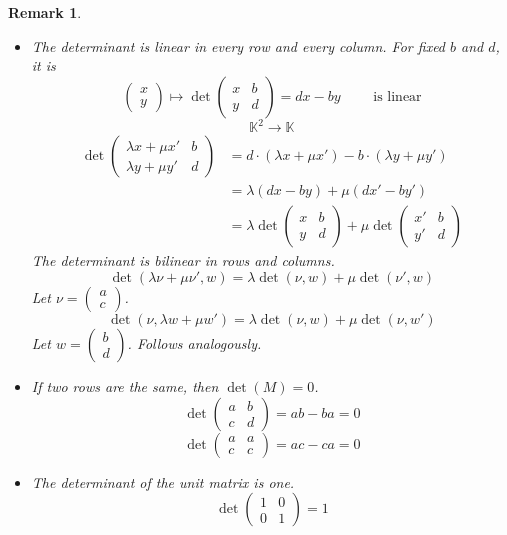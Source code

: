 \documentclass[a4paper]{article}
\numberwithin{lecref}{section}
\newtheorem*{Remark}{Remark}
\newcommand{\vectwo}[2]{\begin{pmatrix} #1 \\ #2 \end{pmatrix}}
\begin{document}
\begin{Remark} \hfill{}
  \begin{itemize}
    \item The determinant is linear in every row and every column.
      For fixed $b$ and $d$, it is
      \[ \vectwo xy \mapsto \det{\begin{pmatrix} x & b \\ y & d \end{pmatrix}} = dx - by \qquad \text{ is linear} \]
      \[ \mathbb K^2 \to \mathbb K \]
      \begin{align*}
        \det{\begin{pmatrix} \lambda x + \mu x' & b \\ \lambda y + \mu y' & d \end{pmatrix}}
          &= d \cdot (\lambda x + \mu x') - b \cdot (\lambda y + \mu y') \\
          &= \lambda (dx - by) + \mu (dx' - by') \\
          &= \lambda \det{\begin{pmatrix} x & b \\ y & d \end{pmatrix}} + \mu \det{\begin{pmatrix} x' & b \\  y' & d \end{pmatrix}}
      \end{align*}
      The determinant is bilinear in rows and columns.
      \[ \det(\lambda \nu + \mu \nu', w) = \lambda \det(\nu, w) + \mu \det(\nu', w) \]
      Let $\nu = \vectwo{a}{c}$.
      \[ \det(\nu, \lambda w + \mu w') = \lambda \det(\nu, w) + \mu \det(\nu, w') \]
      Let $w = \vectwo bd$.
      Follows analogously.
    \item If two rows are the same, then $\det(M) = 0$.
      \[ \det\begin{pmatrix} a & b \\ c & d \end{pmatrix} = ab - ba = 0 \]
      \[ \det\begin{pmatrix} a & a \\ c & c \end{pmatrix} = ac - ca = 0 \]
    \item The determinant of the unit matrix is one.
      \[ \det\begin{pmatrix} 1 & 0 \\ 0 & 1 \end{pmatrix} = 1 \]
  \end{itemize}
\end{Remark}
\end{document}

